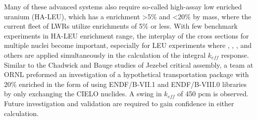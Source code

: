 \documentclass[letterpaper]{ar-1col}
\begin{document}
Many of these advanced systems also require so-called high-assay low enriched uranium (HA-LEU), which has a  enrichment \textgreater5\% and \textless20\% by mass, where the current fleet of LWRs utilize enrichments of 5\% or less. With few benchmark experiments in HA-LEU enrichment range, the interplay of the cross sections for multiple nuclei become important, especially for LEU experiments where , , ,  and others are applied simultaneously in the calculation of the integral $k_{eff}$ response.  Similar to the Chadwick \cite{Cha18} and Bauge \cite{Bau12} studies of Jezebel critical assembly, a team at ORNL preformed an investigation of a hypothetical transportation package with 20\% enriched  in the form of  using ENDF/B-VII.1 and ENDF/B-VIII.0 libraries by only exchanging the CIELO nuclides. A swing in $k_{eff}$ of 450 pcm is observed.  Future investigation and validation are required to gain confidence in either calculation.
\end{document}
